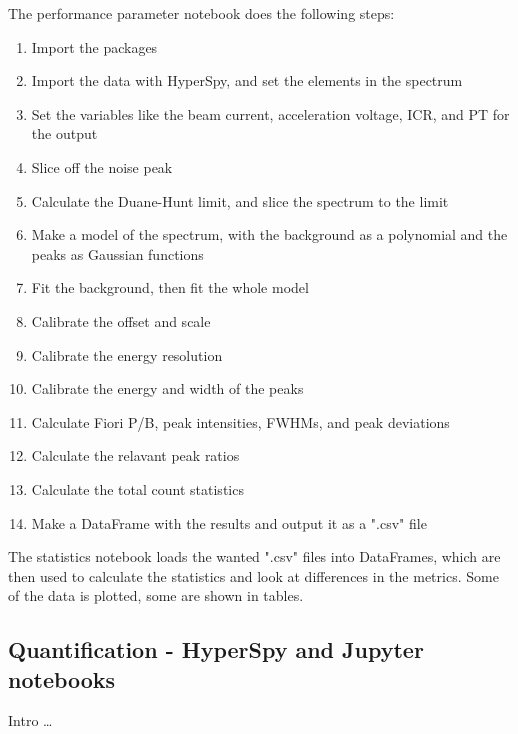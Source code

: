 The performance parameter notebook does the following steps:

\begin{enumerate}
    \item Import the packages
    \item Import the data with HyperSpy, and set the elements in the spectrum
    \item Set the variables like the beam current, acceleration voltage, ICR, and PT for the output
    \item Slice off the noise peak
    \item Calculate the Duane-Hunt limit, and slice the spectrum to the limit
    \item Make a model of the spectrum, with the background as a polynomial and the peaks as Gaussian functions
    \item Fit the background, then fit the whole model
    \item Calibrate the offset and scale
    \item Calibrate the energy resolution
    \item Calibrate the energy and width of the peaks
    \item Calculate Fiori P/B, peak intensities, FWHMs, and peak deviations
    \item Calculate the relavant peak ratios
    \item Calculate the total count statistics
    \item Make a DataFrame with the results and output it as a ".csv" file
\end{enumerate}


The statistics notebook loads the wanted ".csv" files into DataFrames, which are then used to calculate the statistics and look at differences in the metrics.
Some of the data is plotted, some are shown in tables.


























\subsection{Quantification - HyperSpy and Jupyter notebooks}
\label{method:data_treatment:quantification}


Intro \dots




